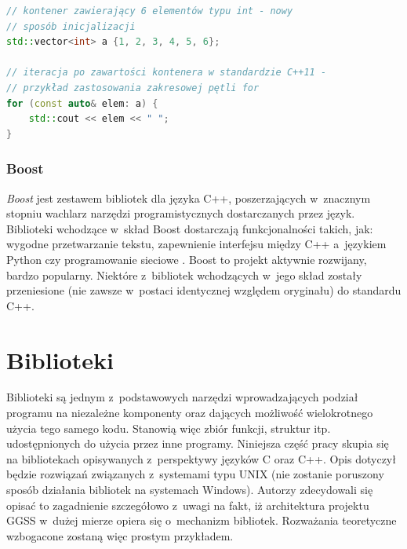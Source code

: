 \begin{lstlisting}[language=c++,caption={Przykład kodu w~języku C++ napisany z~wykorzystaniem funkcjonalności ze standardu C++11 (zakresowa pętla for)},label={lst:cpp11}]
// kontener zawierający 6 elementów typu int - nowy
// sposób inicjalizacji
std::vector<int> a {1, 2, 3, 4, 5, 6};

// iteracja po zawartości kontenera w standardzie C++11 - 
// przykład zastosowania zakresowej pętli for
for (const auto& elem: a) {
	std::cout << elem << " ";
}
\end{lstlisting}


\subsubsection*{Boost}
\textit{Boost} jest zestawem bibliotek dla języka C++, poszerzających w~znacznym stopniu wachlarz narzędzi programistycznych dostarczanych przez język. Biblioteki wchodzące w~skład Boost dostarczają funkcjonalności takich, jak: wygodne przetwarzanie tekstu, zapewnienie interfejsu między C++ a~językiem Python czy programowanie sieciowe \cite{BoostDocs}. Boost to projekt aktywnie rozwijany, bardzo popularny. Niektóre z~bibliotek wchodzących w~jego skład zostały przeniesione (nie zawsze w~postaci identycznej względem oryginału) do standardu C++.

\section{Biblioteki}
\label{section:libs}
Biblioteki są jednym z~podstawowych narzędzi wprowadzających podział programu na niezależne komponenty oraz dających możliwość wielokrotnego użycia tego samego kodu. Stanowią więc zbiór funkcji, struktur itp. udostępnionych do użycia przez inne programy. Niniejsza część pracy skupia się na bibliotekach opisywanych z~perspektywy języków C oraz C++. Opis dotyczył będzie rozwiązań związanych z~systemami typu UNIX (nie zostanie poruszony sposób działania bibliotek na systemach Windows). Autorzy zdecydowali się opisać to zagadnienie szczegółowo z~uwagi na fakt, iż architektura projektu GGSS w~dużej mierze opiera się o~mechanizm bibliotek. Rozważania teoretyczne wzbogacone zostaną więc prostym przykładem.


